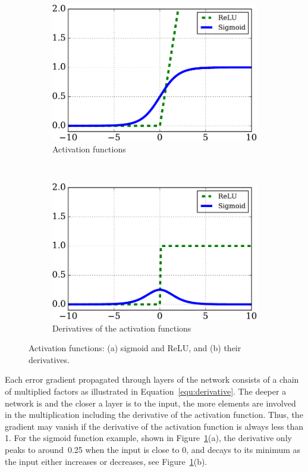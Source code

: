 \begin{figure}[tbp!]
	\centering
	\begin{subfigure}[t]{0.48\textwidth}
		\includegraphics[width=\textwidth]{pics_snn/af.pdf}
		\caption{Activation functions}
	\end{subfigure}
	~~
	\begin{subfigure}[t]{0.48\textwidth}
		\includegraphics[width=\textwidth]{pics_snn/af_der.pdf}
		\caption{Derivatives of the activation functions}
	\end{subfigure}
	\caption[Activation functions]{Activation functions: (a) sigmoid and ReLU, and (b) their derivatives.}
	\label{fig:af}
\end{figure}
Each error gradient propagated through layers of the network consists of a chain of multiplied factors as illustrated in Equation~\ref{equ:derivative}.
The deeper a network is and the closer a layer is to the input, the more elements are involved in the multiplication including the derivative of the activation function.
Thus, the gradient may vanish if the derivative of the activation function is always less than 1.
For the sigmoid function example, shown in Figure~\ref{fig:af}(a), the derivative only peaks to around~0.25 when the input is close to 0, and decays to its minimum as the input either increases or decreases, see Figure~\ref{fig:af}(b).

